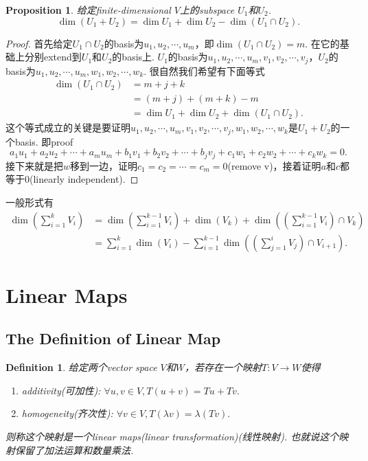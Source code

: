 \documentclass{article}
\newtheorem{proposition}[theorem]{Proposition}
\newtheorem{definition}[theorem]{Definition}
\newcommand*{\xfunc}[4]{{#2}\colon{#3}{#1}{#4}}
\newcommand*{\func}[3]{\xfunc{\to}{#1}{#2}{#3}}
\begin{document}
\begin{proposition}
\rm 给定finite-dimensional $V$上的subspace $U_1$和$U_2$. 
$$
	\dim(U_1+U_2) = \dim U_1 + \dim U_2 - \dim(U_1 \cap U_2).
$$
\end{proposition}

\begin{proof}
首先给定$U_1 \cap U_2$的basis为$u_1,u_2,\cdots,u_m$，即$\dim(U_1 \cap U_2)=m$. 在它的基础上分别extend到$U_1$和$U_2$的basis上. $U_1$的basis为$u_1,u_2,\cdots,u_m,v_1,v_2,\cdots,v_j$，$U_2$的basis为$u_1,u_2,\cdots,u_m,w_1,w_2,\cdots,w_k$. 很自然我们希望有下面等式
$$
\begin{aligned} 
\dim(U_1 \cap U_2) &= m + j + k\\
&= (m+j)+(m+k)-m\\
&= \dim U_1+\dim U_2 + \dim(U_1\cap U_2).
\end{aligned}
$$
这个等式成立的关键是要证明$u_1,u_2,\cdots,u_m,v_1,v_2,\cdots,v_j,w_1,w_2,\cdots,w_k$是$U_1 + U_2$的一个basis. 即proof
$$
a_1u_1+a_2u_2+\cdots+a_mu_m + b_1v_1+b_2v_2+\cdots+b_jv_j+c_1w_1+c_2w_2+\cdots+c_kw_k = 0.
$$
接下来就是把$w$移到一边，证明$c_1=c_2=\cdots=c_m=0$(remove v)，接着证明$a$和$c$都等于$0$(linearly independent).
\end{proof}

{\color{red} 一般形式有}
$$
\begin{aligned}
\dim \left( \sum_{i = 1}^k V_i \right) &= \dim\left( \sum\limits_{i=1}^{k-1} V_i \right) + \dim(V_k) + \dim\left( \left(\sum\limits_{i=1}^{k-1} V_i\right) \cap V_k \right) \\
	&= \sum_{i = 1}^k \dim(V_i) - \sum_{i = 1}^{k-1} \dim \left( \left( \sum_{j = 1}^i V_j \right) \cap V_{i+1} \right).
\end{aligned}	
$$


\newpage
\section{Linear Maps}

\subsection{The Definition of Linear Map}
\begin{definition}
\rm 给定两个vector space $V$和$W$，若存在一个映射$\func{T}{V}{W}$使得
\begin{enumerate}
	\item additivity(可加性): $\forall u,v \in V,T(u+v)=Tu + Tv.$
	\item homogeneity(齐次性): $\forall v \in V, T(\lambda v) = \lambda (Tv).$
\end{enumerate}
则称这个映射是一个linear maps(linear transformation)(线性映射). 也就说这个映射保留了加法运算和数量乘法. 
\end{definition}
\end{document}
